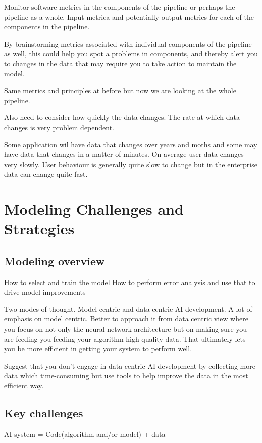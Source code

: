 Monitor software metrics in the components of the pipeline or perhaps the pipeline as a whole.
Input metrica and potentially output metrics for each of the components in the pipeline.

By brainstorming metrics associated with individual components of the pipeline as well, this could help you spot a problems in components, and thereby alert you to changes in the data that may require you to take action to maintain the model.

Same metrics and principles at before but now we are looking at the whole pipeline.

Also need to consider how quickly the data changes.
The rate at which data changes is very problem dependent.

Some application wil have data that changes over years and moths and some may have data that changes in a matter of minutes.
On average user data changes very slowly.
User behaviour is generally quite slow to change but in the enterprise data can change quite fast.


\chapter{Modeling Challenges and Strategies}

\section{Modeling overview}
How to select and train the model
How to perform error analysis and use that to drive model improvements

Two modes of thought.
Model centric and data centric AI development.
A lot of emphasis on model centric.
Better to approach it from data centric view where you focus on not only the neural network architecture but on making sure you are feeding you feeding your algorithm high quality data.
That ultimately lets you be more efficient in getting your system to perform well.

Suggest that you don't engage in data centric AI development by collecting more data which time-consuming but use tools to help improve the data in the most efficient way.

\section{Key challenges}

AI system = Code(algorithm and/or model) + data

